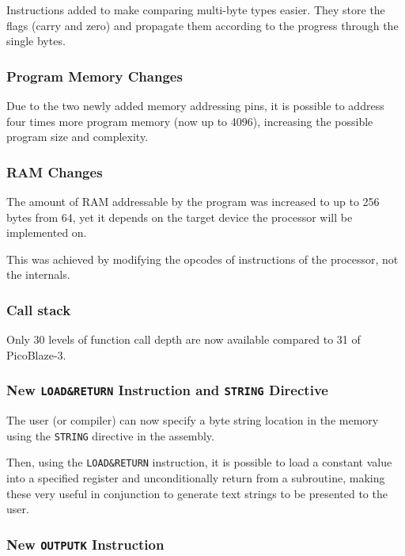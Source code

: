         Instructions added to make comparing multi-byte types easier. They store the flags (carry and zero) and propagate them according to the progress through the single bytes.

        \subsubsection{Program Memory Changes}

        Due to the two newly added memory addressing pins, it is possible to address four times more program memory (now up to 4096), increasing the possible program size and complexity.

        \subsubsection{RAM Changes}

        The amount of RAM addressable by the program was increased to up to 256 bytes from 64, yet it depends on the target device the processor will be implemented on. 

        This was achieved by modifying the opcodes of instructions of the processor, not the internals.

        \subsubsection{Call stack}

        Only 30 levels of function call depth are now available compared to 31 of PicoBlaze-3.

        \subsubsection{New \texttt{LOAD\&RETURN} Instruction and \texttt{STRING} Directive}

        The user (or compiler) can now specify a byte string location in the memory using the \texttt{STRING} directive in the assembly.

        Then, using the \texttt{LOAD\&RETURN} instruction, it is possible to load a constant value into a specified register and unconditionally return from a subroutine, making these very useful in conjunction to generate text strings to be presented to the user.

        \subsubsection{New \texttt{OUTPUTK} Instruction}

